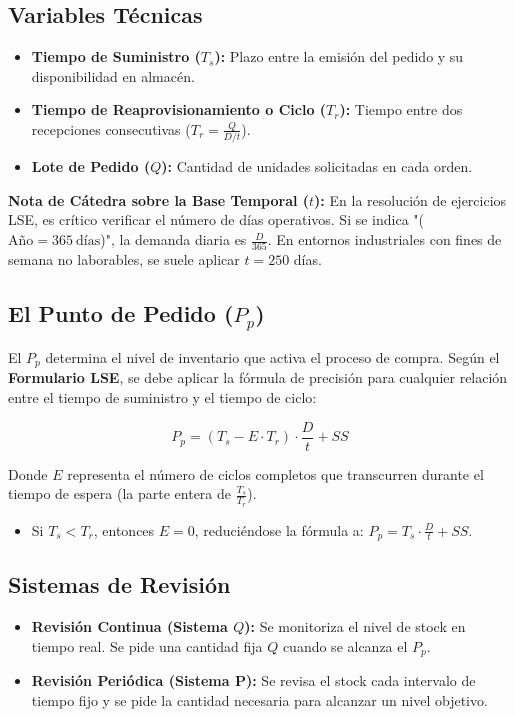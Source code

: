 \documentclass[11pt,a4paper]{article}
\begin{document}
\subsection{Variables Técnicas}

\begin{itemize}
    \item \textbf{Tiempo de Suministro ($T_s$):} Plazo entre la emisión del pedido y su disponibilidad en almacén.
    \item \textbf{Tiempo de Reaprovisionamiento o Ciclo ($T_r$):} Tiempo entre dos recepciones consecutivas ($T_r = \frac{Q}{D/t}$).
    \item \textbf{Lote de Pedido ($Q$):} Cantidad de unidades solicitadas en cada orden.

\end{itemize}
\textbf{Nota de Cátedra sobre la Base Temporal ($t$):} En la resolución de ejercicios LSE, es crítico verificar el número de días operativos. Si se indica "($\text{Año} = 365\ \text{días}$)", la demanda diaria es $\frac{D}{365}$. En entornos industriales con fines de semana no laborables, se suele aplicar $t = 250$ días.

\subsection{El Punto de Pedido ($P_p$)}

El $P_p$ determina el nivel de inventario que activa el proceso de compra. Según el \textbf{Formulario LSE}, se debe aplicar la fórmula de precisión para cualquier relación entre el tiempo de suministro y el tiempo de ciclo:

\[
    P_p = (T_s - E \cdot T_r) \cdot \frac{D}{t} + SS
\]

Donde $E$ representa el número de ciclos completos que transcurren durante el tiempo de espera (la parte entera de $\frac{T_s}{T_r}$).

\begin{itemize}
    \item Si $T_s < T_r$, entonces $E = 0$, reduciéndose la fórmula a: $P_p = T_s \cdot \frac{D}{t} + SS$.

\end{itemize}
\subsection{Sistemas de Revisión}

\begin{itemize}
    \item \textbf{Revisión Continua (Sistema $Q$):} Se monitoriza el nivel de stock en tiempo real. Se pide una cantidad fija $Q$ cuando se alcanza el $P_p$.
    \item \textbf{Revisión Periódica (Sistema P):} Se revisa el stock cada intervalo de tiempo fijo y se pide la cantidad necesaria para alcanzar un nivel objetivo.

\end{itemize}
\end{document}
